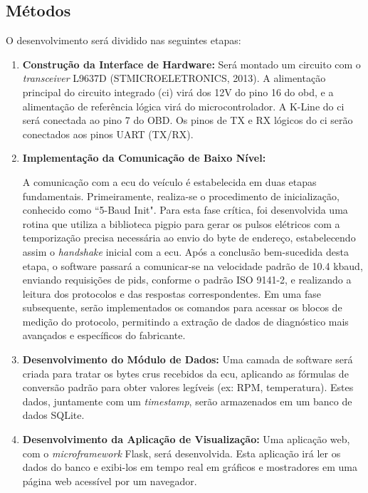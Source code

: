 \documentclass[a4paper, 12pt]{article}
\begin{document}
\subsection{Métodos}

O desenvolvimento será dividido nas seguintes etapas:

\begin{enumerate}

\item \textbf{Construção da Interface de Hardware:} Será montado um circuito com o \textit{transceiver} L9637D (STMICROELETRONICS, 2013). A alimentação principal do circuito integrado (\acrshort{ci}) virá dos 12V do pino 16 do \acrshort{obd}, e a alimentação de referência lógica virá do microcontrolador. A K-Line do \acrshort{ci} será conectada ao pino 7 do OBD. Os pinos de TX e RX lógicos do \acrshort{ci} serão conectados aos pinos UART (TX/RX).

\item \textbf{Implementação da Comunicação de Baixo Nível:}

A comunicação com a \acrshort{ecu} do veículo é estabelecida em duas etapas fundamentais. Primeiramente, realiza-se o procedimento de inicialização, conhecido como ``5-Baud Init". Para esta fase crítica, foi desenvolvida uma rotina que utiliza a biblioteca pigpio para gerar os pulsos elétricos com a temporização precisa necessária ao envio do byte de endereço, estabelecendo assim o \textit{handshake} inicial com a \acrshort{ecu}. Após a conclusão bem-sucedida desta etapa, o software passará a comunicar-se na velocidade padrão de 10.4 kbaud, enviando requisições de \acrshort{pid}s, conforme o padrão ISO 9141-2, e realizando a leitura dos protocolos e das respostas correspondentes. Em uma fase subsequente, serão implementados os comandos para acessar os blocos de medição do protocolo, permitindo a extração de dados de diagnóstico mais avançados e específicos do fabricante.

\item \textbf{Desenvolvimento do Módulo de Dados:} Uma camada de software será criada para tratar os bytes crus recebidos da \acrshort{ecu}, aplicando as fórmulas de conversão padrão para obter valores legíveis (ex: RPM, temperatura). Estes dados, juntamente com um \textit{timestamp}, serão armazenados em um banco de dados SQLite.

\item \textbf{Desenvolvimento da Aplicação de Visualização:} Uma aplicação web, com o \textit{microframework} Flask, será desenvolvida. Esta aplicação irá ler os dados do banco e exibi-los em tempo real em gráficos e mostradores em uma página web acessível por um navegador.


\end{enumerate}
\end{document}
